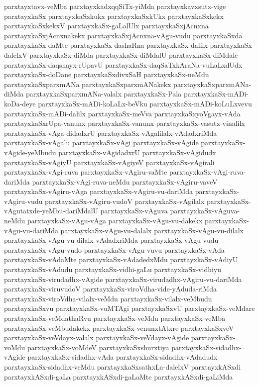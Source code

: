 {parxtayxtavx-veMba
parxtayxkadxqqSiTx-yiMda
parxtayxkavxsutx-vige
parxtayxkaSx
parxtayxkaSxkukx
parxtayxkaSxkUkx
parxtayxkaSxkekx
parxtayxkaSxkekxV
parxtayxkaSx-gaLalUlx
parxtayxkaSxjAcnxna
parxtayxkaSxjAcnxnakekx
parxtayxkaSxjAcnxna-vAgu-vudu
parxtayxkaSxda
parxtayxkaSx-daMte
parxtayxkaSx-dashaRna
parxtayxkaSx-dalilx
parxtayxkaSx-dalelxV
parxtayxkaSx-diMda
parxtayxkaSx-diMdalU
parxtayxkaSx-diMdale
parxtayxkaSx-daqshayx-rUpavU
parxtayxkaSx-daqSaTxkAraNa-vuLaLxdUdx
parxtayxkaSx-doDane
parxtayxkaSxdivxSaH
parxtayxkaSx-neMdu
parxtayxkaSxparxmANa
parxtayxkaSxparxmANakekx
parxtayxkaSxparxmANa-diMda
parxtayxkaSxparxmANa-valalx
parxtayxkaSx-Pala
parxtayxkaSx-mADi-koDa-deye
parxtayxkaSx-mADi-koLaLx-beVku
parxtayxkaSx-mADi-koLuLxvevu
parxtayxkaSx-mADi-dalilx
parxtayxkaSx-meVva
parxtayxkaSxyoVgayx-vAda
parxtayxkaSxrUpa-vanunx
parxtayxkaSx-vanunx
parxtayxkaSx-vasutx-vinalilx
parxtayxkaSx-vAga-didadxrU
parxtayxkaSx-vAgalilalx-vAdadxriMda
parxtayxkaSx-vAgalu
parxtayxkaSx-vAgi
parxtayxkaSx-vAgide
parxtayxkaSx-vAgide-yeMbudu
parxtayxkaSx-vAgidadxrU
parxtayxkaSx-vAgidudx
parxtayxkaSx-vAgiyU
parxtayxkaSx-vAgiyeV
parxtayxkaSx-vAgirali
parxtayxkaSx-vAgi-ruva
parxtayxkaSx-vAgiru-vaMte
parxtayxkaSx-vAgi-ruva-dariMda
parxtayxkaSx-vAgi-ruva-neMdu
parxtayxkaSx-vAgiru-vaveV
parxtayxkaSx-vAgiru-vAga
parxtayxkaSx-vAgiru-vu-dariMda
parxtayxkaSx-vAgiru-vudu
parxtayxkaSx-vAgiru-vudoV
parxtayxkaSx-vAgilalx
parxtayxkaSx-vAgutatxde-yeMbu-dariMdalU
parxtayxkaSx-vAguva
parxtayxkaSx-vAguva-neMdu
parxtayxkaSx-vAgu-vAga
parxtayxkaSx-vAgu-vu-dakekx
parxtayxkaSx-vAgu-vu-dariMda
parxtayxkaSx-vAgu-vu-dalalx
parxtayxkaSx-vAgu-vu-dilalx
parxtayxkaSx-vAgu-vu-dilalx-vAdadxriMda
parxtayxkaSx-vAgu-vudu
parxtayxkaSx-vAgu-vudo
parxtayxkaSx-vAgu-vuvu
parxtayxkaSx-vAda
parxtayxkaSx-vAdaMte
parxtayxkaSx-vAdadedxMdu
parxtayxkaSx-vAdiyU
parxtayxkaSx-vAdudu
parxtayxkaSx-vidhi-gaLu
parxtayxkaSx-vidhiyu
parxtayxkaSx-virudadhx-vAgide
parxtayxkaSx-virudadhx-vAgiru-vu-dariMda
parxtayxkaSx-viruvudoV
parxtayxkaSx-viroVdha-vide-yAduda-riMda
parxtayxkaSx-viroVdha-vilalx-veMdu
parxtayxkaSx-vilalx-veMbudu
parxtayxkaSxvu
parxtayxkaSx-vuMTAgi
parxtayxkaSxvU
parxtayxkaSx-veMdare
parxtayxkaSx-veMdathaRvu
parxtayxkaSx-veMdu
parxtayxkaSx-veMba
parxtayxkaSx-veMbudakekx
parxtayxkaSx-venunxtAtxre
parxtayxkaSxveV
parxtayxkaSx-veVdayx-valalx
parxtayxkaSx-veVdayx-vAgide
parxtayxkaSx-voMdu
parxtayxkaSx-voMdeV
parxtayxkaSxshurxtiya
parxtayxkaSx-sidadhx-vAgide
parxtayxkaSx-sidadhx-vAda
parxtayxkaSx-sidadhx-vAdadudx
parxtayxkaSx-sidadhx-veMdu
parxtayxkaSxsathxLa-dalelxV
parxtayxkASxdi
parxtayxkASxdi-gaLa
parxtayxkASxdi-gaLaMte
parxtayxkASxdi-gaLiMda
}
